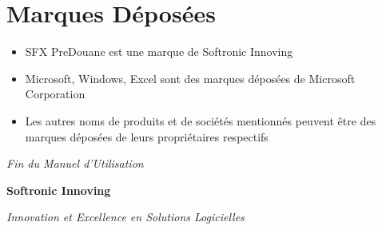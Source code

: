 \documentclass[12pt,a4paper]{report}
\begin{document}
\section*{Marques Déposées}

\begin{itemize}[leftmargin=*]
    \item SFX PreDouane est une marque de Softronic Innoving
    \item Microsoft, Windows, Excel sont des marques déposées de Microsoft Corporation
    \item Les autres noms de produits et de sociétés mentionnés peuvent être des marques déposées de leurs propriétaires respectifs
\end{itemize}

\vfill

\begin{center}
\textit{Fin du Manuel d'Utilisation}

\vspace{1cm}

\textbf{Softronic Innoving}

\textit{Innovation et Excellence en Solutions Logicielles}
\end{center}
\end{document}
